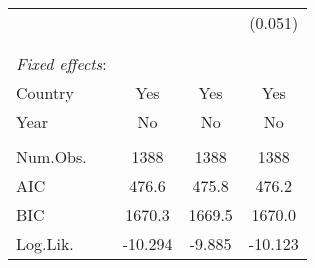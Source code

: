 \documentclass[a4paper, 12pt]{article}
\begin{document}
\begin{table}
\begin{tabular}[t]{lccc}
 &  &  & (0.051)\\
 & & & \\ 
  \hline \\[-1.8ex] 
 \textit{Fixed effects}:\\
Country & Yes & Yes & Yes\\
Year & No & No & No \\
\hline \\[-1.8ex] 
Num.Obs. & 1388 & 1388 & 1388\\
AIC & 476.6 & 475.8 & 476.2\\
BIC & 1670.3 & 1669.5 & 1670.0\\
Log.Lik. & -10.294 & -9.885 & -10.123\\
\hline 
\hline 
\end{tabular}
\end{table}
	
\end{document}
